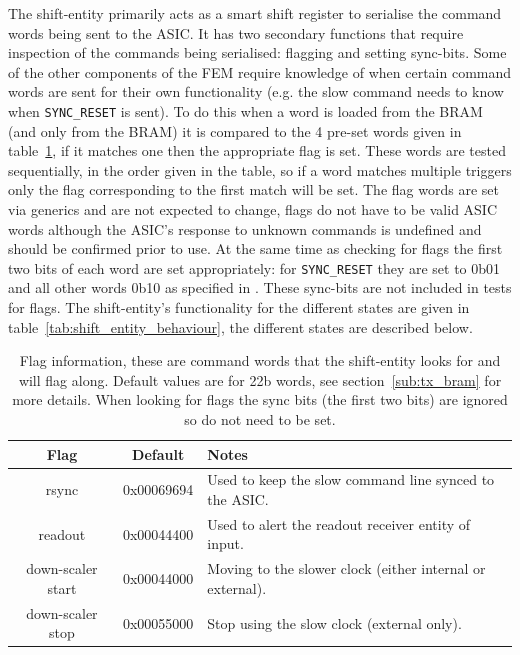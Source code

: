 The shift-entity primarily acts as a smart shift register to serialise the command words being sent to the ASIC. It has two secondary functions that require inspection of the commands being serialised: flagging and setting sync-bits. Some of the other components of the FEM require knowledge of when certain command words are sent for their own functionality (e.g. the slow command needs to know when \texttt{SYNC\_RESET} is sent). To do this when a word is loaded from the BRAM (and only from the BRAM) it is compared to the 4 pre-set words given in table~\ref{tab:shift_entity_flags}, if it matches one then the appropriate flag is set. These words are tested sequentially, in the order given in the table, so if a word matches multiple triggers only the flag corresponding to the first match will be set. The flag words are set via generics and are not expected to change, flags do not have to be valid ASIC words although the ASIC's response to unknown commands is undefined and should be confirmed prior to use. At the same time as checking for flags the first two bits of each word are set appropriately: for \texttt{SYNC\_RESET} they are set to 0b01 and all other words 0b10 as specified in \cite{lpd_manual}. These sync-bits are not included in tests for flags. The shift-entity's functionality for the different states are given in table~\ref{tab:shift_entity_behaviour}, the different states are described below.

\begin{table}[htbp]
  \begin{center}
    \begin{tabular}{c|c|l}
      Flag             & Default    & Notes \\
      \hline
      rsync             & 0x00069694 & Used to keep the slow command line synced to the ASIC.   \\
      readout           & 0x00044400 & Used to alert the readout receiver entity of input.       \\
      down-scaler start & 0x00044000 & Moving to the slower clock (either internal or external).\\
      down-scaler stop  & 0x00055000 & Stop using the slow clock (external only).               \\
    \end{tabular}
  \end{center}
  \caption{Flag information, these are command words that the shift-entity looks for and will flag along. Default values are for 22b words, see section~\ref{sub:tx_bram} for more details. When looking for flags the sync bits (the first two bits) are ignored so do not need to be set.}
  \label{tab:shift_entity_flags}
\end{table}
    
